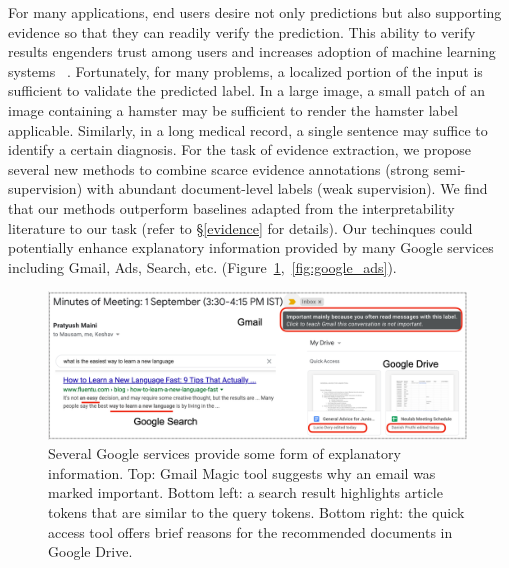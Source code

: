 \documentclass{article}
\begin{document}
For many applications, 
end users desire not only predictions 
but also supporting evidence
so that they can readily verify the prediction.
This ability to verify results engenders trust among users and 
increases adoption of machine learning systems ~\cite{dzindolet2003role, herlocker2000explaining, ribeiro2016should}.
Fortunately, for many problems, a localized portion of the input
is sufficient to validate the predicted label. 
In a large image, a small patch of an image containing a hamster
may be sufficient to render the hamster label applicable. 
Similarly, in a long medical record, a single sentence may suffice
to identify a certain diagnosis.
For the task of evidence extraction,
we propose several new methods to combine 
scarce evidence annotations (strong semi-supervision) 
with abundant document-level labels (weak supervision).
We find that our methods outperform 
baselines adapted from the interpretability literature 
to our task (refer to \S\ref{evidence} for details).
Our techinques
could potentially enhance 
explanatory information provided 
by
many Google services including Gmail, Ads, Search, etc. (Figure~\ref{fig:google},~\ref{fig:google_ads}).
    
\begin{figure}[h]
    \centering
    \includegraphics[width=0.99\textwidth]{google_v2}
    \caption{
    Several Google services provide some form of explanatory information. Top: Gmail Magic tool suggests why an email was marked important. 
    Bottom left: a search result highlights article tokens that are similar to the query tokens.
    Bottom right: the quick access tool offers brief reasons for the recommended documents in Google Drive.
    }
    \label{fig:google}
\end{figure}
\end{document}
